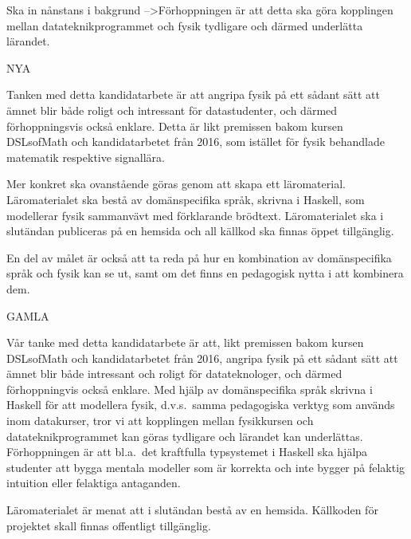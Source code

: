 \begin{draft}

\iffalse
Målet med projektet är att skapa domänspecifika språk för fysik samt ett   
tillhörande läromaterial. Läromaterialets syfte är att beskriva fysiken och
dess koppling till de domänspecifika språken projektgruppen utvecklat.

Nedan beskrivs hur att vi vill väcka intresse för fysik hos
datateknologer genom att presentera fysik ur ett annat perspektiv.
\fi

Ska in nånstans i bakgrund -->Förhoppningen är att detta ska göra kopplingen mellan datateknikprogrammet och fysik tydligare och därmed underlätta lärandet.

NYA

Tanken med detta kandidatarbete är att angripa fysik på ett sådant sätt att ämnet blir både roligt och intressant för datastudenter, och därmed förhoppningsvis också enklare. Detta är likt premissen bakom kursen DSLsofMath och kandidatarbetet från 2016, som istället för fysik behandlade matematik respektive signallära.

Mer konkret ska ovanstående göras genom att skapa ett läromaterial. Läromaterialet ska bestå av domänspecifika språk, skrivna i Haskell, som modellerar fysik sammanvävt med förklarande brödtext. Läromaterialet ska i slutändan publiceras på en hemsida och all källkod ska finnas öppet tillgänglig.

En del av målet är också att ta reda på hur en kombination av domänspecifika språk och fysik kan se ut, samt om det finns en pedagogisk nytta i att kombinera dem.

GAMLA

Vår tanke med detta kandidatarbete är att, likt premissen bakom kursen DSLsofMath
och kandidatarbetet från 2016, angripa fysik på ett sådant sätt att ämnet blir både
intressant och roligt för datateknologer, och därmed förhoppningvis
också enklare. Med hjälp av domänspecifika språk skrivna i Haskell för att
modellera fysik, d.v.s.\ samma pedagogiska verktyg som används inom           %
datakurser, tror vi att kopplingen mellan fysikkursen och
datateknikprogrammet kan göras tydligare och lärandet kan underlättas.
Förhoppningen är att bl.a.\ det kraftfulla typsystemet i Haskell ska
hjälpa studenter att bygga mentala modeller som är korrekta och inte
bygger på felaktig intuition eller felaktiga antaganden.

Läromaterialet är menat att i slutändan bestå av en hemsida. Källkoden för projektet
skall finnas offentligt tillgänglig.


\end{draft}
